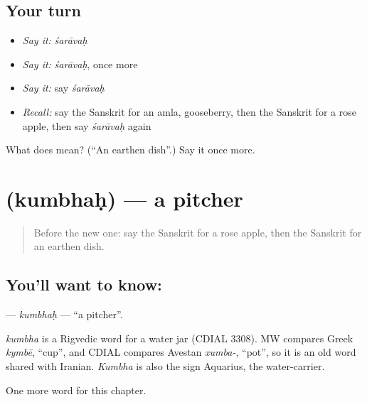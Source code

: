 \subsection*{Your turn}
\begin{itemize}
\raggedright
  \item \emph{Say it:} \emph{śarāvaḥ}
  \item \emph{Say it:} \emph{śarāvaḥ}, once more
  \item \emph{Say it:} say \emph{śarāvaḥ}
  \item \emph{Recall:} say the Sanskrit for an amla, gooseberry, then the Sanskrit for a rose apple, then say \emph{śarāvaḥ} again
\end{itemize}

\begin{tcolorbox}[breakable,colback=teal!4,colframe=teal!35!black,title={Before you move on}]
What does  mean? (\textquotedblleft{}An earthen dish\textquotedblright{}.) Say it once more.
\end{tcolorbox}
\section[\texorpdfstring{\sk{कुम्भः} (kumbhaḥ)}{कुम्भः (kumbhaḥ)}]{ (kumbhaḥ) — a pitcher}

\label{lesson:SA-C191-kumbhah}



\begin{quote}
Before the new one: say the Sanskrit for a rose apple, then the Sanskrit for an earthen dish.
\end{quote}

\subsection*{You'll want to know: }
\textbf{} — \emph{kumbhaḥ} — \textquotedblleft{}a pitcher\textquotedblright{}.

\begin{cousinweb}
\emph{kumbha} is a Rigvedic word for a water jar (CDIAL 3308). MW compares Greek \emph{kymbē}, \textquotedblleft{}cup\textquotedblright{}, and CDIAL compares Avestan \emph{xumba-}, \textquotedblleft{}pot\textquotedblright{}, so it is an old word shared with Iranian. \emph{Kumbha} is also the sign Aquarius, the water-carrier.
\end{cousinweb}

\begin{grammarlens}[title={What you've built}]
One more word for this chapter.
\end{grammarlens}

